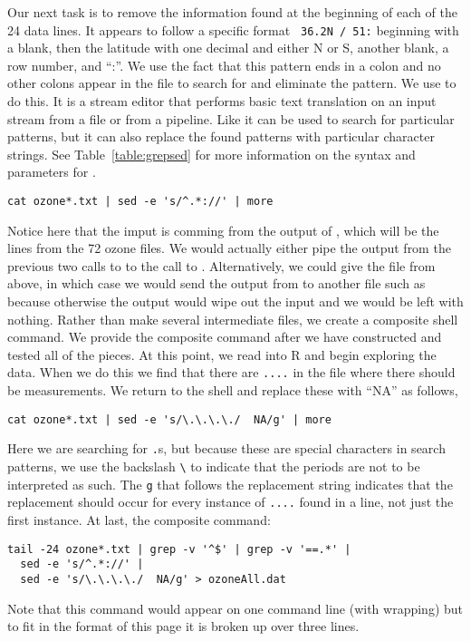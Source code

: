 Our next task is to remove the information found at the beginning of
each of the 24 data lines.  It appears to follow a specific format
\verb+ 36.2N / 51:+ beginning with a blank, then the latitude with one
decimal and either N or S, another blank, a row number, and ``:''.  We
use the fact that this pattern ends in a colon and no other colons
appear in the file to search for and eliminate the pattern.  We use
 to do this.  It is a stream editor that performs basic text
translation on an input stream from a file or from a pipeline.  Like
 it can be used to search for particular patterns, but
it can also replace the found patterns with particular character
strings.  See Table~\ref{table:grepsed} for more information on the
  syntax and parameters for .
\begin{verbatim}
cat ozone*.txt | sed -e 's/^.*://' | more
\end{verbatim}
Notice here that the imput is comming from the output of
, which will be the lines from the 72 ozone files. We
would actually either pipe the output from the previous two calls to
 to the call to .  Alternatively, we
could give  the  file from above, in
which case we would send the output from  to another
file such as  because otherwise the output would
wipe out the input and we would be left with nothing.  Rather than
make several intermediate files, we create a composite shell command.
We provide the composite command after we have constructed and tested
all of the pieces.  At this point, we read  into R
and begin exploring the data.  When we do this we find that there are
\verb+....+ in the file where there should be measurements.  We return
to the shell and replace these with ``NA'' as follows,
\begin{verbatim}
cat ozone*.txt | sed -e 's/\.\.\.\./  NA/g' | more
\end{verbatim}
Here we are searching for \verb+.+s, but because these are special
characters in search patterns, we use the backslash \verb+\+ to
indicate that the periods are not to be interpreted as such.  The
\verb+g+ that follows the replacement string indicates that the
replacement should occur for every instance of \verb+....+ found in a
line, not just the first instance.  At last, the composite command:
\begin{verbatim}
tail -24 ozone*.txt | grep -v '^$' | grep -v '==.*' |
  sed -e 's/^.*://' |
  sed -e 's/\.\.\.\./  NA/g' > ozoneAll.dat
\end{verbatim}
Note that this command would appear on one command line (with
wrapping) but to fit in the format of this page it is broken up over
three lines.
  
